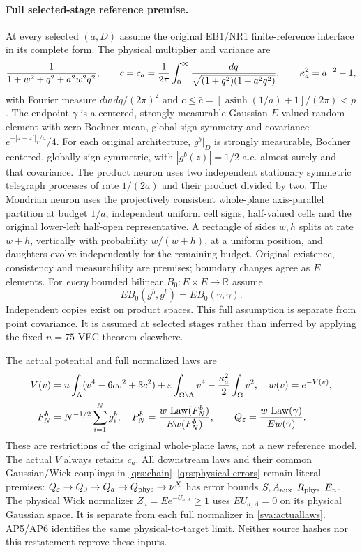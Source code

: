 \documentclass[11pt]{article}
\theoremstyle{plain}
\theoremstyle{definition}
\theoremstyle{remark}
\newcommand{\R}{\mathbb{R}}
\DeclareMathOperator{\Law}{Law}
\begin{document}
\paragraph{Full selected-stage reference premise.}
At every selected $(a,D)$ assume the original EB1/NR1 finite-reference
interface in its complete form. The physical multiplier and variance are
\begin{equation}\label{sva:physicalvariance}
 {1\over1+w^2+q^2+a^2w^2q^2},\qquad
 c=c_a={1\over2\pi}\int_0^\infty
 {dq\over\sqrt{(1+q^2)(1+a^2q^2)}},\qquad \kappa_a^2=a^{-2}-1,
\end{equation}
with Fourier measure $dw\,dq/(2\pi)^2$ and
$c\le\bar c=[\operatorname{asinh}(1/a)+1]/(2\pi)<p$.
The endpoint $\gamma$ is a centered, strongly measurable Gaussian
$E$-valued random element with zero Bochner mean, global sign symmetry
and covariance $e^{-|z-z'|_1/a}/4$. For each original architecture,
$g^b|_D$ is strongly measurable, Bochner centered, globally sign
symmetric, with $|g^b(z)|=1/2$ a.e. almost surely and that covariance.
The product neuron uses two independent stationary symmetric telegraph
processes of rate $1/(2a)$ and their product divided by two. The Mondrian
neuron uses the projectively consistent whole-plane axis-parallel
partition at budget $1/a$, independent uniform cell signs, half-valued
cells and the original lower-left half-open representative. A rectangle
of sides $w,h$ splits at rate $w+h$, vertically with probability
$w/(w+h)$, at a uniform position, and daughters evolve independently for
the remaining budget. Original existence, consistency and measurability
are premises; boundary changes agree as $E$ elements. For \emph{every}
bounded bilinear $B_0:E\times E\to\R$ assume
\begin{equation}\label{sva:bilinear}
 E B_0(g^b,g^b)=E B_0(\gamma,\gamma).
\end{equation}
Independent copies exist on product spaces. This full assumption is
separate from point covariance. It is assumed at selected stages rather
than inferred by applying the fixed-$n=75$ VEC theorem elsewhere.

The actual potential and full normalized laws are
\begin{align}\label{sva:actuallaws}
 V(v)&=u\int_\Lambda(v^4-6cv^2+3c^2)
       +\varepsilon\int_{\Omega\setminus\Lambda}v^4
       -{\kappa_a^2\over2}\int_\Omega v^2,\quad w(v)=e^{-V(v)},\nonumber\\
 F_N^b&=N^{-1/2}\sum_{i=1}^N g_i^b,\quad
 P_N^b={w\,\Law(F_N^b)\over Ew(F_N^b)},\qquad
 Q_\varepsilon={w\,\Law(\gamma)\over Ew(\gamma)}.
\end{align}
These are restrictions of the original whole-plane laws, not a new
reference model. The actual $V$ always retains $c_a$. All downstream
laws and their common Gaussian/Wick couplings in
\eqref{qrs:chain}--\eqref{qrs:physical-errors} remain literal premises:
$Q_\varepsilon\to Q_0\to Q_a\to Q_{\rm phys}\to\nu^X$ has error bounds
$S,A_{\rm aux},R_{\rm phys},E_n$. The physical Wick normalizer
$Z_a=E e^{-U_{a,\Lambda}}\ge1$ uses $EU_{a,\Lambda}=0$ on its physical
Gaussian space. It is separate from each full normalizer in
\eqref{sva:actuallaws}. AP5/AP6 identifies the same physical-to-target
limit. Neither source hashes nor this restatement reprove these inputs.
\end{document}
